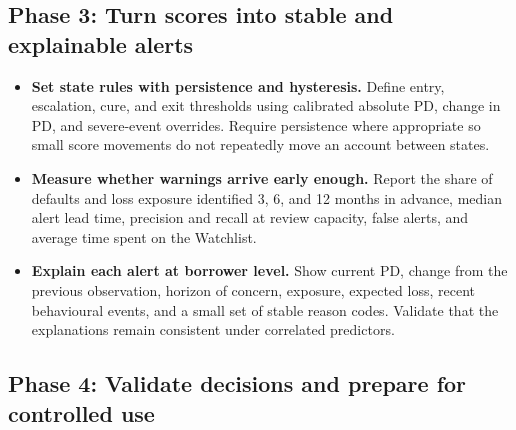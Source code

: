\documentclass[11pt]{article}
\begin{document}
\subsection*{Phase 3: Turn scores into stable and explainable alerts}

\begin{itemize}[label=$\square$,leftmargin=2em]
  \item \textbf{Set state rules with persistence and hysteresis.} Define entry,
  escalation, cure, and exit thresholds using calibrated absolute PD, change in PD,
  and severe-event overrides. Require persistence where appropriate so small score
  movements do not repeatedly move an account between states.

  \item \textbf{Measure whether warnings arrive early enough.} Report the share of
  defaults and loss exposure identified 3, 6, and 12 months in advance, median alert
  lead time, precision and recall at review capacity, false alerts, and average time
  spent on the Watchlist.

  \item \textbf{Explain each alert at borrower level.} Show current PD, change from
  the previous observation, horizon of concern, exposure, expected loss, recent
  behavioural events, and a small set of stable reason codes. Validate that the
  explanations remain consistent under correlated predictors.
\end{itemize}

\subsection*{Phase 4: Validate decisions and prepare for controlled use}
\end{document}
